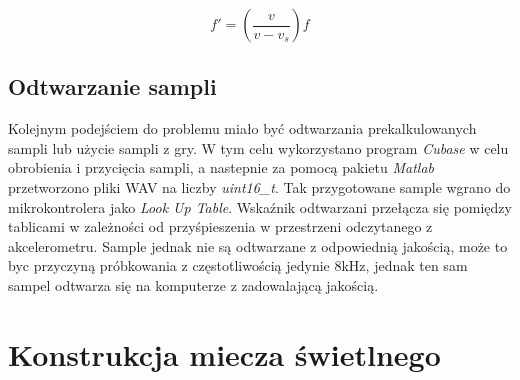 \documentclass[10pt, a4paper]{article}
\begin{document}
 \begin{equation}
 f' = \left(\frac{v}{v-v_{s}}\right)f
 \label{eq:dop}
 \end{equation}
 
 \subsection{Odtwarzanie sampli}
 Kolejnym podejściem do problemu miało być odtwarzania prekalkulowanych sampli lub użycie sampli z gry. W tym celu wykorzystano program \textit{Cubase} w celu obrobienia i przycięcia sampli, a nastepnie za pomocą pakietu \textit{Matlab} przetworzono pliki WAV na liczby \textit{uint16\_t}. Tak przygotowane sample wgrano do mikrokontrolera jako \textit{Look Up Table}. Wskaźnik odtwarzani przełącza się pomiędzy tablicami w zależności od przyśpieszenia w przestrzeni odczytanego z akcelerometru. Sample jednak nie są odtwarzane z odpowiednią jakością, może to byc przyczyną próbkowania z częstotliwością jedynie 8kHz, jednak ten sam sampel odtwarza się na komputerze z zadowalającą jakością.



\section{Konstrukcja miecza świetlnego}	
\end{document}
